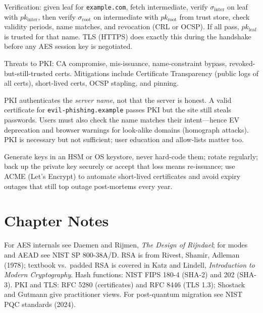 Verification: given leaf for \texttt{example.com}, fetch intermediate, verify $\sigma_{\text{inter}}$ on leaf with $pk_{\text{inter}}$, then verify $\sigma_{\text{root}}$ on intermediate with $pk_{\text{root}}$ from trust store, check validity periods, name matches, and revocation (CRL or OCSP). If all pass, $pk_{\text{leaf}}$ is trusted for that name. TLS (HTTPS) does exactly this during the handshake before any AES session key is negotiated.

Threats to PKI: CA compromise, mis-issuance, name-constraint bypass, revoked-but-still-trusted certs. Mitigations include Certificate Transparency (public logs of all certs), short-lived certs, OCSP stapling, and pinning.

\begin{example}
PKI authenticates the \emph{server name}, not that the server is honest. A valid certificate for \texttt{evil-phishing.example} passes PKI but the site still steals passwords. Users must also check the name matches their intent---hence EV deprecation and browser warnings for look-alike domains (homograph attacks). PKI is necessary but not sufficient; user education and allow-lists matter too.
\end{example}

\begin{remark}
Generate keys in an HSM or OS keystore, never hard-code them; rotate regularly; back up the private key securely or accept that loss means re-issuance; use ACME (Let's Encrypt) to automate short-lived certificates and avoid expiry outages that still top outage post-mortems every year.
\end{remark}

\section{Chapter Notes}
For AES internals see Daemen and Rijmen, \emph{The Design of Rijndael}; for modes and AEAD see NIST SP 800-38A/D. RSA is from Rivest, Shamir, Adleman (1978); textbook vs.\ padded RSA is covered in Katz and Lindell, \emph{Introduction to Modern Cryptography}. Hash functions: NIST FIPS 180-4 (SHA-2) and 202 (SHA-3). PKI and TLS: RFC 5280 (certificates) and RFC 8446 (TLS 1.3); Shostack and Gutmann give practitioner views. For post-quantum migration see NIST PQC standards (2024).

